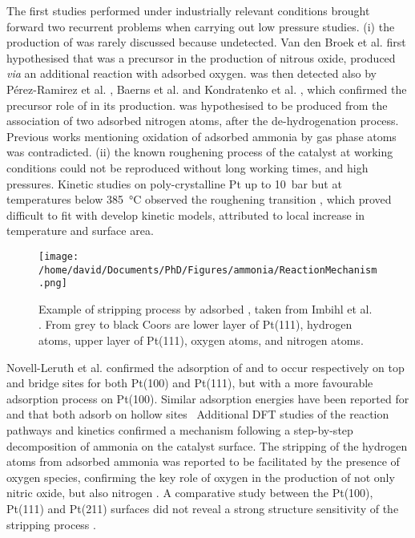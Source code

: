 The first studies performed under industrially relevant conditions brought forward two recurrent problems when carrying out low pressure studies.
(i) the production of  was rarely discussed because undetected.
Van den Broek et al. \parencite*{vandenBroek1999} first hypothesised that  was a precursor in the production of nitrous oxide, produced \textit{via} an additional reaction with adsorbed oxygen.
 was then detected also by Pérez-Ramirez et al. \parencite*{PerezRamirez2004}, Baerns et al. \parencite*{Baerns2005} and Kondratenko et al. \parencite*{Kondratenko2007}, which confirmed the precursor role of  in its production.
 was hypothesised to be produced from the association of two adsorbed nitrogen atoms, after the de-hydrogenation process.
Previous works mentioning oxidation of adsorbed ammonia by gas phase atoms was contradicted.
(ii) the known roughening process of the catalyst at working conditions could not be reproduced without long working times, and high pressures.
Kinetic studies on poly-crystalline Pt up to \qty{10}{\bar} but at temperatures below \qty{385}{\degreeCelsius} observed the roughening transition \parencite{Kraehnert2008}, which proved difficult to fit with develop kinetic models, attributed to local increase in temperature and surface area.

\begin{figure}[!htb]
    \centering
    \texttt{[image: /home/david/Documents/PhD/Figures/ammonia/ReactionMechanism.png]}
    \caption{
    Example of  stripping process by adsorbed , taken from Imbihl et al. \parencite*{Imbihl2007}.
    From grey to black Coors are lower layer of Pt(111), hydrogen atoms, upper layer of Pt(111), oxygen atoms, and nitrogen atoms.
    }
    \label{fig:ReactionMechanism}
\end{figure}

Novell-Leruth et al. \parencite*{NovellLeruth2005} confirmed the adsorption of  and  to occur respectively on top and bridge sites for both Pt(100) and Pt(111), but with a more favourable adsorption process on Pt(100).
Similar adsorption energies have been reported for  and  that both adsorb on hollow sites \
Additional DFT studies of the reaction pathways and kinetics confirmed a mechanism following a step-by-step decomposition of ammonia on the catalyst surface.
The stripping of the hydrogen atoms from adsorbed ammonia was reported to be facilitated by the presence of oxygen species, confirming the key role of oxygen in the production of not only nitric oxide, but also nitrogen \parencite{Offermans2006}.
A comparative study between the Pt(100), Pt(111) and Pt(211) surfaces did not reveal a strong structure sensitivity of the \ce{NH_3} stripping process \parencite{Offermans2007}.

